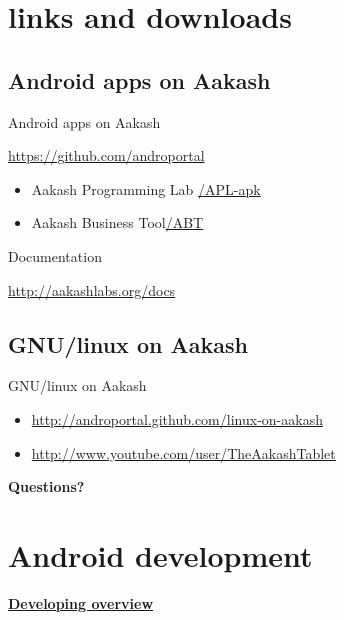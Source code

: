 \documentclass{beamer}
\begin{document}
\section{links and downloads}
\subsection{Android apps on Aakash}
\begin{frame}{Android apps on Aakash}
  \begin{block}{\url{https://github.com/androportal}}
    \begin{itemize}
      \item Aakash Programming Lab \hfill \url{/APL-apk}
      \item Aakash Business Tool\hfill \url{/ABT}
    \end{itemize}
  \end{block}
  \begin{block}{Documentation}
      \centerline{\url {http://aakashlabs.org/docs}}
  \end{block}
\end{frame}

\subsection{GNU/linux on Aakash}
\begin{frame}{GNU/linux on Aakash}
  \begin{block}{}
    \begin{itemize}
    \item \url{http://androportal.github.com/linux-on-aakash}
    \item \url{http://www.youtube.com/user/TheAakashTablet}
    \end{itemize}
  \end{block}
\end{frame}

\begin{frame}{}
  \centerline{\bf Questions?}
\end{frame}

\section{Android development}

\begin{frame}
\begin{center}
  \centerline{\href{file:///home/sachin/github/slides/icfoss2013/test.svg}{\bf
  Developing overview}}
\end{center}  
\end{frame}
\end{document}

